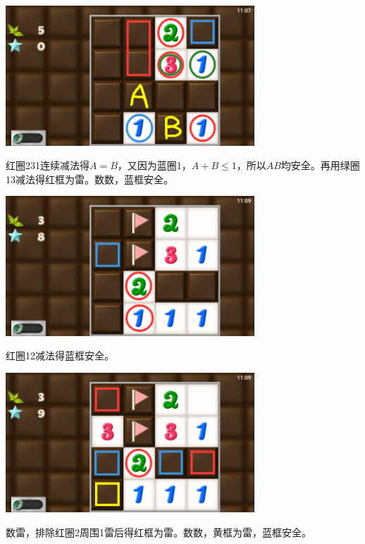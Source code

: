\subsection{} %
\begin{center}
    \includegraphics[width=0.7\textwidth]{puzzle/127-1.png}
\end{center}
红圈231连续减法得$A=B$，又因为蓝圈1，$A+B\le 1$，所以$AB$均安全。再用绿圈13减法得红框为雷。数数，蓝框安全。
\begin{center}
    \includegraphics[width=0.7\textwidth]{puzzle/127-2.png}
\end{center}
红圈12减法得蓝框安全。
\begin{center}
    \includegraphics[width=0.7\textwidth]{puzzle/127-3.png}
\end{center}
数雷，排除红圈2周围1雷后得红框为雷。数数，黄框为雷，蓝框安全。

